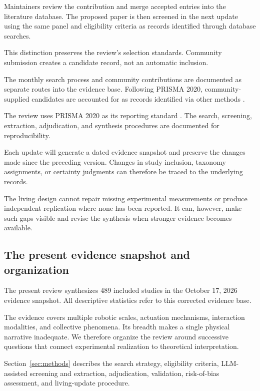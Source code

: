 Maintainers
review the
contribution
and merge
accepted entries
into the
literature database.
The proposed
paper is
then screened
in the next
update using
the same
panel and
eligibility criteria
as records
identified through
database searches.

This distinction
preserves the
review's selection
standards.
Community submission
creates a
candidate record,
not an
automatic inclusion.

The monthly
search process
and community
contributions
are documented
as separate
routes into
the evidence
base.
Following
PRISMA 2020,
community-supplied
candidates are
accounted for
as records
identified via
other methods
\cite{Page2021prisma}.

The review
uses PRISMA 2020
as its reporting
standard
\cite{Page2021prisma}.
The search,
screening,
extraction,
adjudication,
and synthesis
procedures are
documented
for reproducibility.

Each update
will generate
a dated
evidence snapshot
and preserve
the changes
made since
the preceding
version.
Changes in
study inclusion,
taxonomy assignments,
or certainty
judgments can
therefore be
traced to
the underlying
records.

The living
design cannot
repair missing
experimental
measurements
or produce
independent
replication
where none
has been
reported.
It can,
however,
make such
gaps visible
and revise
the synthesis
when stronger
evidence
becomes available.

\subsection{The present evidence snapshot and organization}
\label{sec:introduction-roadmap}

The present review synthesizes
489 included studies
in the October 17, 2026
evidence snapshot.
All descriptive
statistics refer
to this corrected
evidence base.

The evidence
covers multiple
robotic scales,
actuation mechanisms,
interaction modalities,
and collective
phenomena.
Its breadth
makes a
single physical
narrative inadequate.
We therefore
organize the
review around
successive
questions that
connect experimental
realization
to theoretical
interpretation.

Section~\ref{sec:methods}
describes the
search strategy,
eligibility criteria,
LLM-assisted
screening and
extraction,
adjudication,
validation,
risk-of-bias
assessment,
and living-update
procedure.

